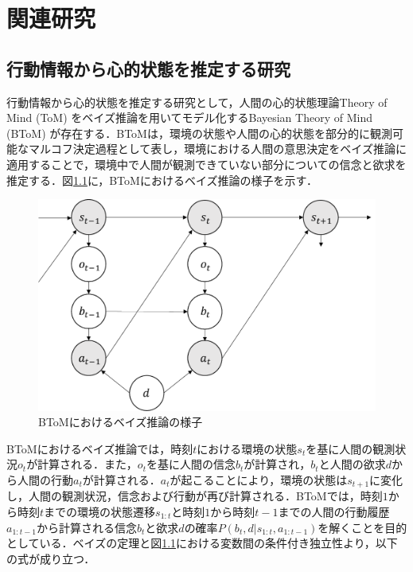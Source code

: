 \chapter{関連研究}

\section{行動情報から心的状態を推定する研究}
\par
行動情報から心的状態を推定する研究として，人間の心的状態理論Theory of Mind (ToM) \cite{子安増生1997心の理論}をベイズ推論を用いてモデル化するBayesian Theory of Mind (BToM) \cite{baker2011bayesian}が存在する．BToMは，環境の状態や人間の心的状態を部分的に観測可能なマルコフ決定過程として表し，環境における人間の意思決定をベイズ推論に適用することで，環境中で人間が観測できていない部分についての信念と欲求を推定する．図\ref{fig:btom}に，BToMにおけるベイズ推論の様子を示す．
\begin{figure}[htbp]
  \begin{center}
    \includegraphics[scale=0.8]{./btom.pdf}
    \caption{BToMにおけるベイズ推論の様子}
    \label{fig:btom}
  \end{center}
\end{figure}
BToMにおけるベイズ推論では，時刻$t$における環境の状態$s_{t}$を基に人間の観測状況$o_{t}$が計算される．また，$o_{t}$を基に人間の信念$b_{t}$が計算され，$b_{t}$と人間の欲求$d$から人間の行動$a_{t}$が計算される．$a_{t}$が起こることにより，環境の状態は$s_{t+1}$に変化し，人間の観測状況，信念および行動が再び計算される．BToMでは，時刻$1$から時刻$t$までの環境の状態遷移$s_{1:t}$と時刻$1$から時刻$t-1$までの人間の行動履歴$a_{1:t-1}$から計算される信念$b_t$と欲求$d$の確率$P(b_t,d|s_{1:t},a_{1:t-1})$を解くことを目的としている．ベイズの定理\cite{ベイズ}と図\ref{fig:btom}における変数間の条件付き独立性より，以下の式が成り立つ．
